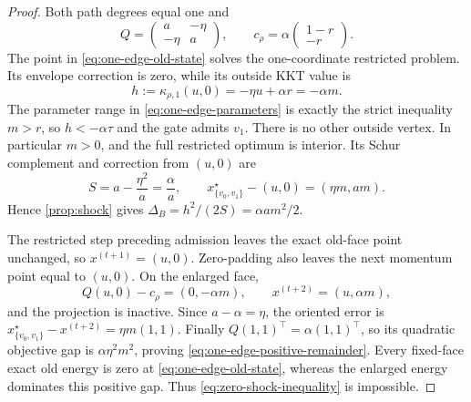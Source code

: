 \begin{proof}
Both path degrees equal one and
\begin{equation}
 Q=\begin{pmatrix}a&-\eta\\-\eta&a\end{pmatrix},
 \qquad
 c_\rho=\alpha\begin{pmatrix}1-r\\-r\end{pmatrix}.
\end{equation}
The point in \cref{eq:one-edge-old-state} solves the one-coordinate
restricted problem.  Its envelope correction is zero, while its outside KKT
value is
\begin{equation}
 h:=\kappa_{\rho,1}(u,0)
 =-\eta u+\alpha r=-\alpha m.
\end{equation}
The parameter range in \cref{eq:one-edge-parameters} is exactly the strict
inequality $m>r$, so $h<-\alpha\tau$ and the gate admits $v_1$.  There is no
other outside vertex.  In particular $m>0$, and the full restricted optimum
is interior.  Its Schur complement and correction from $(u,0)$ are
\begin{equation}
 S=a-\frac{\eta^2}{a}=\frac\alpha a,
 \qquad
 x_{\{v_0,v_1\}}^\star-(u,0)=(\eta m,am).
 \label{eq:one-edge-optimum-shift}
\end{equation}
Hence \cref{prop:shock} gives
$\Delta_B=h^2/(2S)=\alpha a m^2/2$.

The restricted step preceding admission leaves the exact old-face point
unchanged, so $x^{(t+1)}=(u,0)$.  Zero-padding also leaves the next momentum
point equal to $(u,0)$.  On the enlarged face,
\begin{equation}
 Q(u,0)-c_\rho=(0,-\alpha m),
 \qquad
 x^{(t+2)}=(u,\alpha m),
\end{equation}
and the projection is inactive.  Since $a-\alpha=\eta$, the oriented error is
$x_{\{v_0,v_1\}}^\star-x^{(t+2)}=\eta m(1,1)$.  Finally
$Q(1,1)^\top=\alpha(1,1)^\top$, so its quadratic objective gap is
$\alpha\eta^2m^2$, proving \cref{eq:one-edge-positive-remainder}.  Every
fixed-face exact old energy is zero at \cref{eq:one-edge-old-state}, whereas
the enlarged energy dominates this positive gap.  Thus
\cref{eq:zero-shock-inequality} is impossible.
\end{proof}

